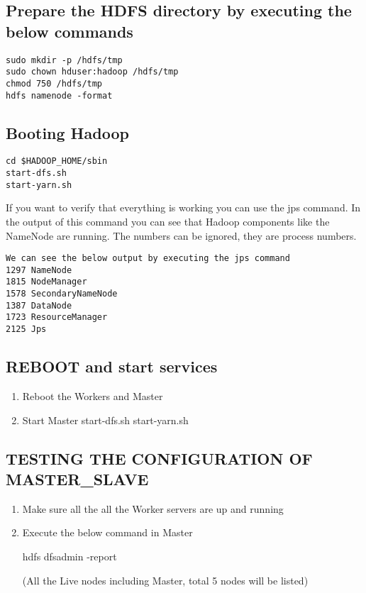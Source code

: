 \subsection{Prepare the HDFS directory by executing the below commands}

\begin{lstlisting}
sudo mkdir -p /hdfs/tmp 
sudo chown hduser:hadoop /hdfs/tmp 
chmod 750 /hdfs/tmp 
hdfs namenode -format 
\end{lstlisting}

\subsection{Booting Hadoop}

\begin{lstlisting}
cd $HADOOP_HOME/sbin 
start-dfs.sh 
start-yarn.sh 
\end{lstlisting}

If you want to verify that everything is working you can use the jps
command. In the output of this command you can see that Hadoop
components like the NameNode are running. The numbers can be ignored,
they are process numbers.

\begin{lstlisting}
We can see the below output by executing the jps command 
1297 NameNode
1815 NodeManager
1578 SecondaryNameNode
1387 DataNode
1723 ResourceManager
2125 Jps
\end{lstlisting}

\subsection{REBOOT and start services}

\begin{enumerate}
\def\labelenumi{\alph{enumi})}
\item
  Reboot the Workers and Master
\item
  Start Master start-dfs.sh start-yarn.sh
\end{enumerate}

\subsection{TESTING THE CONFIGURATION OF MASTER\_SLAVE}

\begin{enumerate}
\def\labelenumi{\alph{enumi})}
\item
  Make sure all the all the Worker servers are up and running
\item
  Execute the below command in Master

  hdfs dfsadmin -report

  (All the Live nodes including Master, total 5 nodes will be listed)
\end{enumerate}

